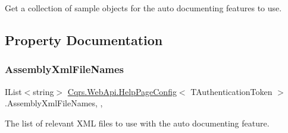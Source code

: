 Get a collection of sample objects for the auto documenting features to use. 



\subsection{Property Documentation}
\mbox{\label{classCqrs_1_1WebApi_1_1HelpPageConfig_a62d6b1d61b668f53f5394b26e1c0b0fa_a62d6b1d61b668f53f5394b26e1c0b0fa}} 
\subsubsection{\texorpdfstring{Assembly\+Xml\+File\+Names}{AssemblyXmlFileNames}}
{\footnotesize\ttfamily I\+List$<$string$>$ \hyperlink{classCqrs_1_1WebApi_1_1HelpPageConfig}{Cqrs.\+Web\+Api.\+Help\+Page\+Config}$<$ T\+Authentication\+Token $>$.Assembly\+Xml\+File\+Names\hspace{0.3cm}{\ttfamily [static]}, {\ttfamily [get]}, {\ttfamily [set]}}



The list of relevant X\+ML files to use with the auto documenting feature. 


